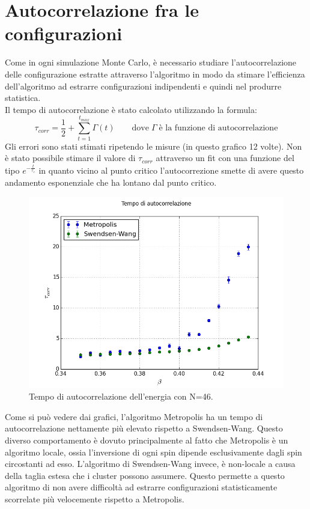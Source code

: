 \section{Autocorrelazione fra le configurazioni}
Come in ogni simulazione Monte Carlo, è necessario studiare l'autocorrelazione delle configurazione estratte attraverso l'algoritmo in modo da stimare l'efficienza dell'algoritmo ad estrarre configurazioni
indipendenti e quindi nel produrre statistica.\\
Il tempo di autocorrelazione è stato calcolato utilizzando la formula:
$$
	\tau_{corr} = \frac{1}{2} + \sum_{t=1}^{t_{max}} \Gamma(t) \qquad \mbox{dove} \; \Gamma \; \mbox{è la funzione di autocorrelazione}
$$
Gli errori sono stati stimati ripetendo le misure (in questo grafico 12 volte).
Non è stato possibile stimare il valore di $\tau_{corr}$ attraverso un fit con una funzione del tipo $e^{-\frac{t}{\tau_{c}}}$ in quanto vicino al punto critico l'autocorrezione smette di avere questo andamento esponenziale che ha lontano dal punto critico.
\begin{figure}[h]
\includegraphics[scale=0.6]{compare.png}
\caption{Tempo di autocorrelazione dell'energia con N=46.}
\end{figure}
Come si può vedere dai grafici, l'algoritmo Metropolis ha un tempo di autocorrelazione nettamente più elevato rispetto a Swendsen-Wang. Questo diverso comportamento è dovuto principalmente al fatto che Metropolis è un algoritmo locale, ossia l'inversione di ogni spin dipende esclusivamente dagli spin circostanti ad esso. L'algoritmo di Swendsen-Wang invece, è non-locale a causa della taglia estesa  che i cluster possono assumere.
Questo permette a questo algoritmo di non avere difficoltà ad estrarre configurazioni statisticamente scorrelate più velocemente rispetto a Metropolis.

